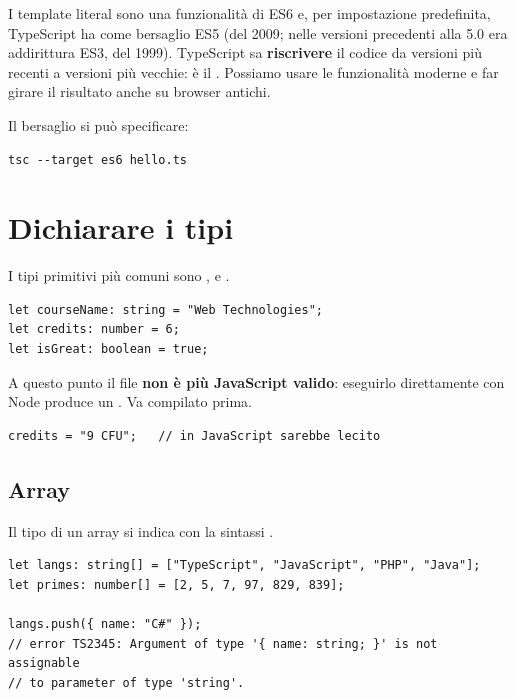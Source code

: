 I template literal sono una funzionalità di ES6 e, per impostazione predefinita,
TypeScript ha come bersaglio ES5 (del 2009; nelle versioni precedenti alla 5.0
era addirittura ES3, del 1999). TypeScript sa \textbf{riscrivere}
il codice da versioni più recenti a versioni più vecchie: è il
. Possiamo usare le funzionalità moderne e far girare il
risultato anche su browser antichi.

Il bersaglio si può specificare:

\begin{lstlisting}[style=shell]
tsc --target es6 hello.ts
\end{lstlisting}

\section{Dichiarare i tipi}

I tipi primitivi più comuni sono ,  e
.

\begin{lstlisting}[style=ts, name=primitive_types.ts]
let courseName: string = "Web Technologies";
let credits: number = 6;
let isGreat: boolean = true;
\end{lstlisting}

A questo punto il file \textbf{non è più JavaScript valido}: eseguirlo
direttamente con Node produce un . Va compilato prima.

\begin{affianco}[0.47][c]
\begin{lstlisting}[style=ts]
credits = "9 CFU";   // in JavaScript sarebbe lecito
\end{lstlisting}
\risultato
{}
\end{affianco}

\subsection{Array}

Il tipo di un array si indica con la sintassi .

\begin{lstlisting}[style=ts, name=array.ts]
let langs: string[] = ["TypeScript", "JavaScript", "PHP", "Java"];
let primes: number[] = [2, 5, 7, 97, 829, 839];

langs.push({ name: "C#" });
// error TS2345: Argument of type '{ name: string; }' is not assignable
// to parameter of type 'string'.
\end{lstlisting}

